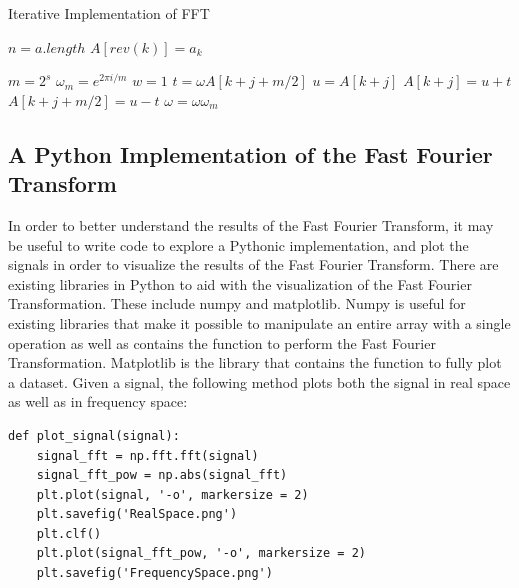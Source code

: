 \documentclass{amsproc}
\begin{document}
\begin{algorithm}
\caption{Iterative Implementation of FFT}\label{it-fft}
\begin{algorithmic}[1]

\State $n = a.length$
	\State $A[rev(k)] = a_k$ 
\EndFor

\EndProcedure


\State {}
	\State $m = 2^s$
	\State $\omega_m = e^{2 \pi i / m}$
		\State $w = 1$
			\State $t = \omega A[k + j + m/2]$
			\State $u = A[k+j]$
			\State $A[k+j] = u + t$
			\State $A[k+j+m/2] = u - t$
			\State $\omega = \omega \omega_m$
		\EndFor
	\EndFor
\EndFor

\EndProcedure

\end{algorithmic}
\end{algorithm}

\subsection{A Python Implementation of the Fast Fourier Transform}

In order to better understand the results of the Fast Fourier Transform, it may be useful to write code to explore a Pythonic implementation, and  plot the signals in order to visualize the results of the Fast Fourier Transform. There are existing libraries in Python to aid with the visualization of the Fast Fourier Transformation. These include numpy and matplotlib. Numpy is useful for existing libraries that make it possible to manipulate an entire array with a single operation as well as contains the function to perform the Fast Fourier Transformation. Matplotlib is the library that contains the function to fully plot a dataset. Given a signal, the following method plots both the signal in real space as well as in frequency space:

\begin{Verbatim}[tabsize=4]
def plot_signal(signal):
	signal_fft = np.fft.fft(signal)
	signal_fft_pow = np.abs(signal_fft)
	plt.plot(signal, '-o', markersize = 2)
	plt.savefig('RealSpace.png')
	plt.clf()
	plt.plot(signal_fft_pow, '-o', markersize = 2)
	plt.savefig('FrequencySpace.png')
\end{Verbatim}
\end{document}
